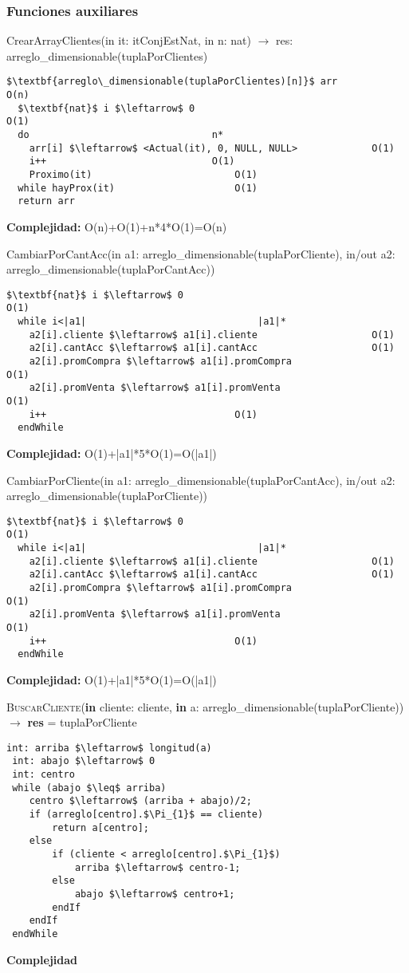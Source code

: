 \subsubsection{Funciones auxiliares}
CrearArrayClientes(in it: itConjEstNat, in n: nat) $\rightarrow$ res: arreglo\_dimensionable(tuplaPorClientes)
\begin{lstlisting}[mathescape]
  $\textbf{arreglo\_dimensionable(tuplaPorClientes)[n]}$ arr					O(n)
  $\textbf{nat}$ i $\leftarrow$ 0									O(1)
  do								n*
    arr[i] $\leftarrow$ <Actual(it), 0, NULL, NULL>				O(1)
    i++								O(1)
    Proximo(it)							O(1)
  while hayProx(it)						O(1)
  return arr
\end{lstlisting}
\textbf{Complejidad:} O(n)+O(1)+n*4*O(1)=O(n)

CambiarPorCantAcc(in a1: arreglo\_dimensionable(tuplaPorCliente), in/out a2: arreglo\_dimensionable(tuplaPorCantAcc))
\begin{lstlisting}[mathescape]
  $\textbf{nat}$ i $\leftarrow$ 0										O(1)
  while i<|a1|								|a1|*
    a2[i].cliente $\leftarrow$ a1[i].cliente					O(1)
    a2[i].cantAcc $\leftarrow$ a1[i].cantAcc					O(1)
    a2[i].promCompra $\leftarrow$ a1[i].promCompra					O(1)
    a2[i].promVenta $\leftarrow$ a1[i].promVenta					O(1)
    i++									O(1)
  endWhile
\end{lstlisting}
\textbf{Complejidad:} O(1)+|a1|*5*O(1)=O(|a1|)

CambiarPorCliente(in a1: arreglo\_dimensionable(tuplaPorCantAcc), in/out a2: arreglo\_dimensionable(tuplaPorCliente))
\begin{lstlisting}[mathescape]
  $\textbf{nat}$ i $\leftarrow$ 0										O(1)
  while i<|a1|								|a1|*
    a2[i].cliente $\leftarrow$ a1[i].cliente					O(1)
    a2[i].cantAcc $\leftarrow$ a1[i].cantAcc					O(1)
    a2[i].promCompra $\leftarrow$ a1[i].promCompra					O(1)
    a2[i].promVenta $\leftarrow$ a1[i].promVenta					O(1)
    i++									O(1)
  endWhile
\end{lstlisting}
\textbf{Complejidad:} O(1)+|a1|*5*O(1)=O(|a1|)

\textsc{BuscarCliente}(\textbf{in} cliente: cliente, \textbf{in} a: arreglo\_dimensionable(tuplaPorCliente)) $\rightarrow$ \textbf{res} = tuplaPorCliente
\begin{lstlisting}[mathescape]
 int: arriba $\leftarrow$ longitud(a)
 int: abajo $\leftarrow$ 0
 int: centro
 while (abajo $\leq$ arriba)
 	centro $\leftarrow$ (arriba + abajo)/2;
    if (arreglo[centro].$\Pi_{1}$ == cliente)
 		return a[centro];
    else
 		if (cliente < arreglo[centro].$\Pi_{1}$)
   			arriba $\leftarrow$ centro-1;
 		else
   			abajo $\leftarrow$ centro+1;
   		endIf
   	endIf
 endWhile
\end{lstlisting}
\textbf{Complejidad}\\

